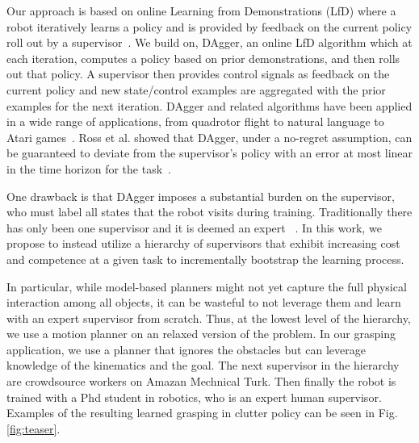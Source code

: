 \documentclass[10pt, conference]{ieeeconf}      %
\begin{document}
Our approach is based on online Learning from Demonstrations (LfD) where a robot iteratively learns a policy and is
provided by feedback on the current policy roll out by a supervisor~\cite{grollman2007dogged,ross2010efficient,ross2010reduction}. 
We build on, DAgger, an online LfD algorithm which at each iteration, computes a policy based on prior demonstrations,
and then rolls out that policy. A supervisor then provides control signals as feedback on the current policy
and new state/control examples are aggregated with the prior examples for the next iteration. DAgger and related algorithms have been applied in a wide range of applications, from quadrotor flight to natural language to Atari games~\cite{NIPS2014_5421,duvallet2013imitation,ross2013learning}. 
Ross et al. showed that DAgger, under a no-regret assumption, can be guaranteed to deviate from the supervisor's policy with an error
at most linear in the time horizon for the task~\cite{ross2010reduction}.

One drawback is that DAgger imposes a substantial burden on the supervisor, who must label all states that the robot
visits during training.  Traditionally there has only been one supervisor and it is deemed an expert
~\cite{ross2010efficient,ross2010reduction,ross2013learning,duvallet2013imitation}. In this work, we propose to instead
utilize a hierarchy of supervisors that exhibit increasing cost and competence at a given task to incrementally
bootstrap the learning process. 

In particular, while model-based planners might not yet capture the full physical interaction among all objects, it can be wasteful to not leverage them and learn with an expert supervisor from scratch. Thus, at the lowest level of the hierarchy, we use a motion planner on an relaxed version of the problem. In our grasping application, we use a planner that ignores the obstacles but can leverage knowledge of the kinematics and the goal.
The next supervisor in the hierarchy are crowdsource workers on Amazan Mechnical Turk. Then finally the robot is trained with a Phd student in robotics, who is an expert human supervisor. Examples of the resulting learned grasping in clutter policy can be seen in Fig. \ref{fig:teaser}. 

\end{document}
